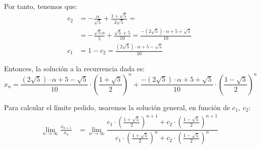 \begin{ejercicio}
    Por tanto, tenemos que:
    \begin{align*}
        c_2 &= -\frac{\alpha}{\sqrt{5}} + \frac{1+\sqrt{5}}{2\sqrt{5}}=\\
        &= -\frac{\sqrt{5}\alpha}{5} + \frac{\sqrt{5}+5}{10}
        = \frac{-(2\sqrt{5})\cdot \alpha + 5+\sqrt{5}}{10}\\
        c_1 &= 1-c_2 = \frac{(2\sqrt{5})\cdot \alpha +5-\sqrt{5}}{10}
    \end{align*}
    
    Entonces, la solución a la recurrencia dada es:
    \begin{equation*}
        x_n = \frac{(2\sqrt{5})\cdot \alpha +5-\sqrt{5}}{10}\cdot \left(\frac{1+\sqrt{5}}{2}\right)^n + \frac{-(2\sqrt{5})\cdot \alpha + 5+\sqrt{5}}{10}\cdot \left(\frac{1-\sqrt{5}}{2}\right)^n
    \end{equation*}

    Para calcular el límite pedido, usaremos la solución general, en función de $c_1,~c_2$:
    \begin{align*}
        \lim_{n\to \infty} \frac{x_{n+1}}{x_n}
        &= \lim_{n\to \infty} \dfrac{c_1\cdot \left(\frac{1+\sqrt{5}}{2}\right)^{n+1} + c_2\cdot \left(\frac{1-\sqrt{5}}{2}\right)^{n+1}}{c_1\cdot \left(\frac{1+\sqrt{5}}{2}\right)^n + c_2\cdot \left(\frac{1-\sqrt{5}}{2}\right)^n}
    \end{align*}
\end{ejercicio}

